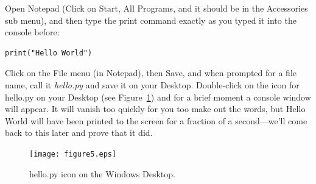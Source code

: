 \begin{WINDOWS}
Open Notepad (Click on Start, All Programs, and it should be in the Accessories sub menu), and then type the print command exactly as you typed it into the console before:

\begin{listing}
\begin{verbatim}
print("Hello World")
\end{verbatim}
\end{listing}

Click on the File menu (in Notepad), then Save, and when prompted for a file name, call it \emph{hello.py} and save it on your Desktop. Double-click on the icon for hello.py on your Desktop (see Figure~\ref{fig5}) and for a brief moment a console window will appear.  It will vanish too quickly for you too make out the words, but Hello World will have been printed to the screen for a fraction of a second---we'll come back to this later and prove that it did.\\

\begin{figure}
\begin{center}
\texttt{[image: figure5.eps]}
\end{center}
\caption{hello.py icon on the Windows Desktop.}\label{fig5}
\end{figure}
\end{WINDOWS}

